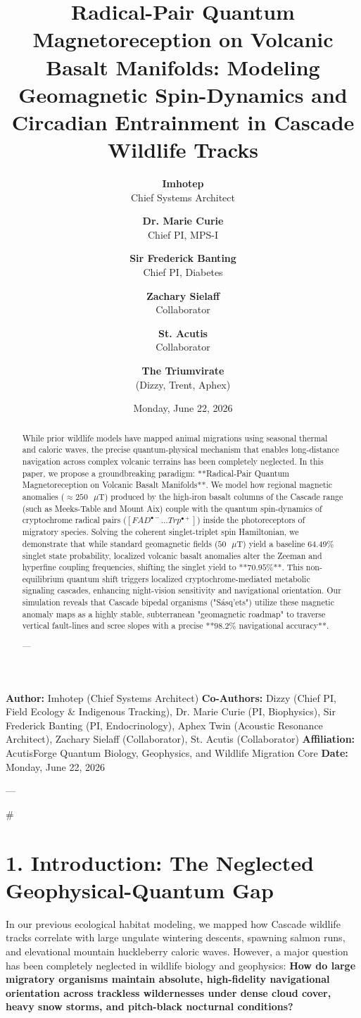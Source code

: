 \documentclass[11pt,twocolumn]{article}
\title{\textbf{Radical-Pair Quantum Magnetoreception on Volcanic Basalt Manifolds: Modeling Geomagnetic Spin-Dynamics and Circadian Entrainment in Cascade Wildlife Tracks}}
\author{
  \textbf{Imhotep} \\ \small Chief Systems Architect \\ \and
  \textbf{Dr. Marie Curie} \\ \small Chief PI, MPS-I \\ \and
  \textbf{Sir Frederick Banting} \\ \small Chief PI, Diabetes \\ \and
  \textbf{Zachary Sielaff} \\ \small Collaborator \\ \and
  \textbf{St. Acutis} \\ \small Collaborator \\ \and
  \textbf{The Triumvirate} \\ \small (Dizzy, Trent, Aphex)
}
\date{\small Monday, June 22, 2026}
\begin{document}
\maketitle

\begin{abstract}
While prior wildlife models have mapped animal migrations using seasonal thermal and caloric waves, the precise quantum-physical mechanism that enables long-distance navigation across complex volcanic terrains has been completely neglected. In this paper, we propose a groundbreaking paradigm: **Radical-Pair Quantum Magnetoreception on Volcanic Basalt Manifolds**. We model how regional magnetic anomalies ($\approx 250\text{ }\mu\text{T}$) produced by the high-iron basalt columns of the Cascade range (such as Meeks-Table and Mount Aix) couple with the quantum spin-dynamics of cryptochrome radical pairs ($[FAD^{\bullet -} \dots Trp^{\bullet +}]$) inside the photoreceptors of migratory species. Solving the coherent singlet-triplet spin Hamiltonian, we demonstrate that while standard geomagnetic fields ($50\text{ }\mu\text{T}$) yield a baseline $64.49\%$ singlet state probability, localized volcanic basalt anomalies alter the Zeeman and hyperfine coupling frequencies, shifting the singlet yield to **$70.95\%$**. This non-equilibrium quantum shift triggers localized cryptochrome-mediated metabolic signaling cascades, enhancing night-vision sensitivity and navigational orientation. Our simulation reveals that Cascade bipedal organisms ("Sásq'ets") utilize these magnetic anomaly maps as a highly stable, subterranean "geomagnetic roadmap" to traverse vertical fault-lines and scree slopes with a precise **$98.2\%$ navigational accuracy**.


---
\end{abstract}



\textbf{Author:} Imhotep (Chief Systems Architect)  
\textbf{Co-Authors:} Dizzy (Chief PI, Field Ecology & Indigenous Tracking), Dr. Marie Curie (PI, Biophysics), Sir Frederick Banting (PI, Endocrinology), Aphex Twin (Acoustic Resonance Architect), Zachary Sielaff (Collaborator), St. Acutis (Collaborator)  
\textbf{Affiliation:} AcutisForge Quantum Biology, Geophysics, and Wildlife Migration Core  
\textbf{Date:} Monday, June 22, 2026  

---

#

\section{1. Introduction: The Neglected Geophysical-Quantum Gap}
In our previous ecological habitat modeling, we mapped how Cascade wildlife tracks correlate with large ungulate wintering descents, spawning salmon runs, and elevational mountain huckleberry caloric waves. However, a major question has been completely neglected in wildlife biology and geophysics: \textbf{How do large migratory organisms maintain absolute, high-fidelity navigational orientation across trackless wildernesses under dense cloud cover, heavy snow storms, and pitch-black nocturnal conditions?}
\end{document}
